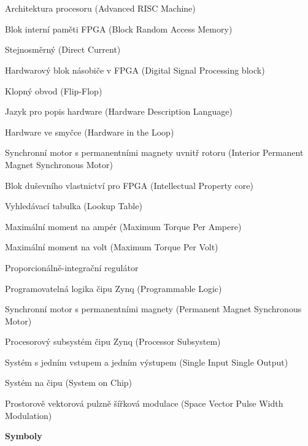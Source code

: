 \cleardoublepage
\chapter*{\listofabbrevname}
{}

\begin{acronym}[DSP48E1]

    {Architektura procesoru (Advanced RISC Machine)}

    {Blok interní paměti FPGA (Block Random Access Memory)}

    {Stejnosměrný (Direct Current)}

    {Hardwarový blok násobiče v FPGA (Digital Signal Processing block)}

    {Klopný obvod (Flip-Flop)}

    {Jazyk pro popis hardware (Hardware Description Language)}

    {Hardware ve smyčce (Hardware in the Loop)}

    {Synchronní motor s permanentními magnety uvnitř rotoru (Interior Permanent Magnet Synchronous Motor)}

    {Blok duševního vlastnictví pro FPGA (Intellectual Property core)}

    {Vyhledávací tabulka (Lookup Table)}

    {Maximální moment na ampér (Maximum Torque Per Ampere)}

    {Maximální moment na volt (Maximum Torque Per Volt)}

    {Proporcionálně-integrační regulátor}

    {Programovatelná logika čipu Zynq (Programmable Logic)}

    {Synchronní motor s permanentními magnety (Permanent Magnet Synchronous Motor)}

    {Procesorový subsystém čipu Zynq (Processor Subsystem)}

    {Systém s jedním vstupem a jedním výstupem (Single Input Single Output)}

    {Systém na čipu (System on Chip)}

    {Prostorově vektorová pulzně šířková modulace (Space Vector Pulse Width Modulation)}

\bigskip
\noindent\textbf{Symboly}
\bigskip


\end{acronym}
